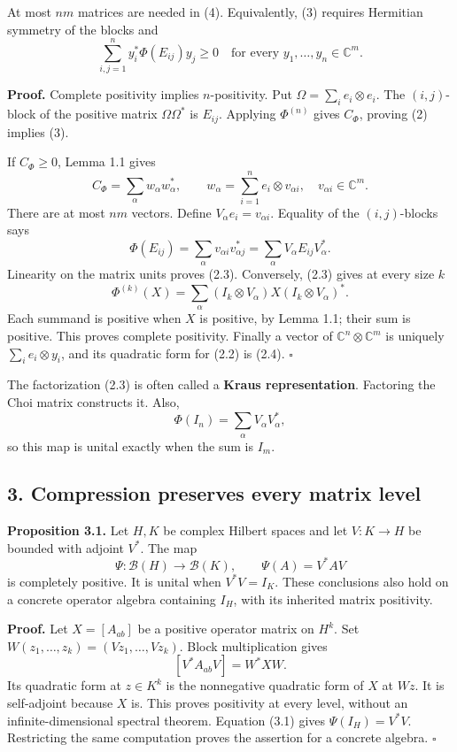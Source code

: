 \documentclass[
  11pt,
]{article}
\begin{document}
At most \(nm\) matrices are needed in (4). Equivalently, (3) requires
Hermitian symmetry of the blocks and \[
\sum_{i,j=1}^n y_i^*\Phi(E_{ij})y_j\geq0
\quad\text{for every }y_1,\ldots,y_n\in\mathbb C^m.
\tag{2.4}
\]

\textbf{Proof.} Complete positivity implies \(n\)-positivity. Put
\(\Omega=\sum_i e_i\otimes e_i\). The \((i,j)\)-block of the positive
matrix \(\Omega\Omega^*\) is \(E_{ij}\). Applying \(\Phi^{(n)}\) gives
\(C_\Phi\), proving (2) implies (3).

If \(C_\Phi\geq0\), Lemma 1.1 gives \[
C_\Phi=\sum_\alpha w_\alpha w_\alpha^*,
\qquad
w_\alpha=\sum_{i=1}^n e_i\otimes v_{\alpha i},
\quad v_{\alpha i}\in\mathbb C^m.
\] There are at most \(nm\) vectors. Define
\(V_\alpha e_i=v_{\alpha i}\). Equality of the \((i,j)\)-blocks says \[
\Phi(E_{ij})=\sum_\alpha v_{\alpha i}v_{\alpha j}^*
            =\sum_\alpha V_\alpha E_{ij}V_\alpha^*.
\] Linearity on the matrix units proves (2.3). Conversely, (2.3) gives
at every size \(k\) \[
\Phi^{(k)}(X)
=\sum_\alpha (I_k\otimes V_\alpha)
                   X(I_k\otimes V_\alpha)^*.
\tag{2.5}
\] Each summand is positive when \(X\) is positive, by Lemma 1.1; their
sum is positive. This proves complete positivity. Finally a vector of
\(\mathbb C^n\otimes\mathbb C^m\) is uniquely \(\sum_i e_i\otimes y_i\),
and its quadratic form for (2.2) is (2.4). \(\square\)

The factorization (2.3) is often called a \textbf{Kraus representation}.
Factoring the Choi matrix constructs it. Also, \[
\Phi(I_n)=\sum_\alpha V_\alpha V_\alpha^*,
\tag{2.6}
\] so this map is unital exactly when the sum is \(I_m\).

\subsection{3. Compression preserves every matrix
level}\label{compression-preserves-every-matrix-level}

\textbf{Proposition 3.1.} Let \(H,K\) be complex Hilbert spaces and let
\(V:K\to H\) be bounded with adjoint \(V^*\). The map \[
\Psi:\mathcal B(H)\longrightarrow\mathcal B(K),
\qquad \Psi(A)=V^*AV
\tag{3.1}
\] is completely positive. It is unital when \(V^*V=I_K\). These
conclusions also hold on a concrete operator algebra containing \(I_H\),
with its inherited matrix positivity.

\textbf{Proof.} Let \(X=[A_{ab}]\) be a positive operator matrix on
\(H^k\). Set \(W(z_1,\ldots,z_k)=(Vz_1,\ldots,Vz_k)\). Block
multiplication gives \[
[V^*A_{ab}V]=W^*XW.
\] Its quadratic form at \(z\in K^k\) is the nonnegative quadratic form
of \(X\) at \(Wz\). It is self-adjoint because \(X\) is. This proves
positivity at every level, without an infinite-dimensional spectral
theorem. Equation (3.1) gives \(\Psi(I_H)=V^*V\). Restricting the same
computation proves the assertion for a concrete algebra. \(\square\)
\end{document}
